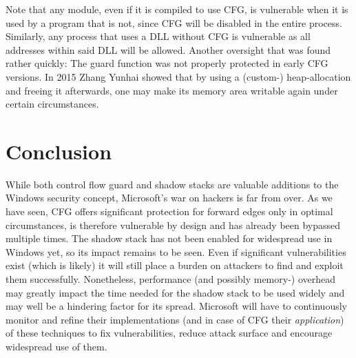 \documentclass[10pt,twocolumn,a4paper]{article}
\begin{document}
Note that any module, even if it is compiled to use CFG, is vulnerable when it is used by a program that is not, since CFG will be disabled in the entire process\cite{cfgexplore}.
Similarly, any process that uses a DLL without CFG is vulnerable as all addresses within said DLL will be allowed\cite{cfgbypass2}.
Another oversight that was found rather quickly: The guard function was not properly protected in early CFG versions.
In 2015 Zhang Yunhai showed that by using a (custom-) heap-allocation and freeing it afterwards,  one may make its memory area writable again under certain circumstances\cite{cfgbypass}.


\section{Conclusion}\label{sec:conclusion}

While both control flow guard and shadow stacks are valuable additions to the Windows security concept, Microsoft's war on hackers is far from over. As we have seen, CFG offers significant protection for forward edges only in optimal circumstances, is therefore vulnerable by design and has already been bypassed multiple times. The shadow stack has not been enabled for widespread use in Windows yet, so its impact remains to be seen. Even if significant vulnerabilities exist (which is likely) it will still place a burden on attackers to find and exploit them successfully.
Nonetheless, performance (and possibly memory-) overhead may greatly impact the time needed for the shadow stack to be used widely and may well be a hindering factor for its spread.
Microsoft will have to continuously monitor and refine their implementations (and in case of CFG their \emph{application}) of these techniques to fix vulnerabilities, reduce attack surface and encourage widespread use of them.




\end{document}

